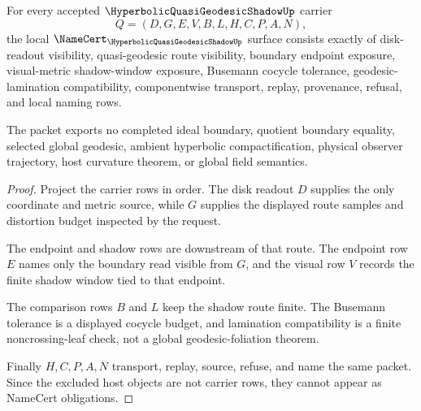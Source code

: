 \begin{theorem}
\label{thm:hyperbolic-quasi-geodesic-shadow-namecert-obligations}
For every accepted $\HyperbolicQuasiGeodesicShadowUp$ carrier
$$
Q=(D,G,E,V,B,L,H,C,P,A,N),
$$
the local $\NameCert_{\HyperbolicQuasiGeodesicShadowUp}$ surface consists exactly of disk-readout visibility, quasi-geodesic route visibility, boundary endpoint exposure, visual-metric shadow-window exposure, Busemann cocycle tolerance, geodesic-lamination compatibility, componentwise transport, replay, provenance, refusal, and local naming rows.

The packet exports no completed ideal boundary, quotient boundary equality, selected global geodesic, ambient hyperbolic compactification, physical observer trajectory, host curvature theorem, or global field semantics.
\end{theorem}
\begin{proof}
Project the carrier rows in order. The disk readout $D$ supplies the only coordinate and metric source, while $G$ supplies the displayed route samples and distortion budget inspected by the request.

The endpoint and shadow rows are downstream of that route. The endpoint row $E$ names only the boundary read visible from $G$, and the visual row $V$ records the finite shadow window tied to that endpoint.

The comparison rows $B$ and $L$ keep the shadow route finite. The Busemann tolerance is a displayed cocycle budget, and lamination compatibility is a finite noncrossing-leaf check, not a global geodesic-foliation theorem.

Finally $H,C,P,A,N$ transport, replay, source, refuse, and name the same packet. Since the excluded host objects are not carrier rows, they cannot appear as NameCert obligations.
\end{proof}

